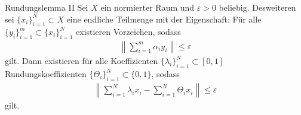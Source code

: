 \begin{genericthm}{Rundungslemma II}\label{th:lemma_for_pecherskii_2}
	Sei $ X $ ein normierter Raum und $ \varepsilon > 0 $ beliebig.
	Desweiteren sei $ \{x_i\}_{i =1}^N \subset X $ eine endliche Teilmenge mit der Eigenschaft:
	Für alle $ \{y_i\}_{i = 1}^m \subset \{x_i\}_{i = 1}^N $ existieren Vorzeichen, sodass 
	\begin{align*}
		\left\|
		\sum \limits_{i = 1}^m \alpha_i y_i
		\right\|
		\leq \varepsilon
	\end{align*}
	gilt.
	Dann existieren für alle Koeffizienten $ \{\lambda_i\}_{i = 1}^N \subset [0,1] $
	Rundungskoeffizienten $ \{\Theta_i\}_{i = 1}^N \subset \{0,1\} $, sodass 
	\begin{align}
		\left\|
		\sum \limits_{i = 1}^N
		\lambda_i x_i
		-
		\sum \limits_{i = 1}^N
		\Theta_i x_i
		\right\|
		\leq \varepsilon
	\end{align}
	gilt.
\end{genericthm}

